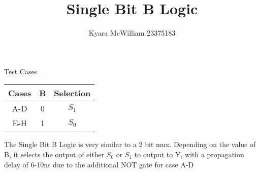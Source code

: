 \documentclass{article}
\title{Single Bit B Logic}
\author{Kyara McWilliam 23375183}
\date{}
\begin{document}
\maketitle

Test Cases
\hfill \break

\begin{tabular}{ |c|c|c| }
\hline
Cases & B & Selection \\
\hline
A-D & 0 & $S_1$ \\
E-H & 1 & $S_0$ \\
\hline
\end{tabular}
\hfill \break \break
The Single Bit B Logic is very similar to a 2 bit mux. Depending on the value of B, it selects the output of either $S_0$ or $S_1$ to output to Y, with a propagation delay of 6-10ns due to the additional NOT gate for case A-D
\end{document}
